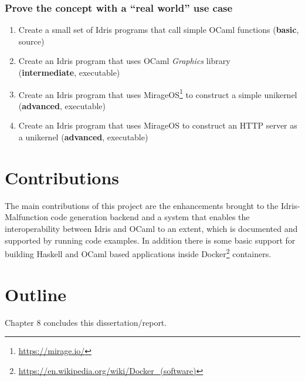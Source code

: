 \subsubsection{Prove the concept with a ``real world'' use case}
\begin{enumerate}
	\item Create a small set of Idris programs that call simple
	      OCaml functions (\textbf{basic}, source)
	\item Create an Idris program that uses OCaml \emph{Graphics}
	      library \\ (\textbf{intermediate}, executable)
	\item Create an Idris program that uses MirageOS\footnote{\url{
			      https://mirage.io/}} to construct a simple
	      unikernel (\textbf{advanced}, executable)
	\item Create an Idris program that uses MirageOS to construct an
	      HTTP server as a unikernel (\textbf{advanced}, executable)
\end{enumerate}



\section{Contributions}
The main contributions of this project are the enhancements brought
to the Idris-Malfunction code generation backend and a
system that enables the interoperability between Idris and OCaml
to an extent, which is documented and supported by running code
examples. In addition there is some basic support for building
Haskell and OCaml based applications inside
Docker\footnote{\url{https://en.wikipedia.org/wiki/Docker_(software)}}
containers.





\section{Outline}


Chapter 8 concludes this dissertation/report.